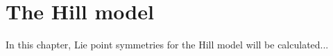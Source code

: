 \chapter{The Hill model}
%
In this chapter, Lie point symmetries for the Hill model will be calculated...